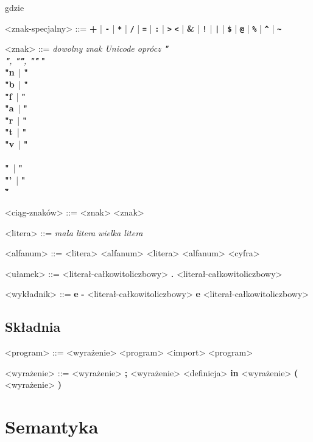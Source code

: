 \documentclass[12pt]{article}
\begin{document}
gdzie\\

\begin{grammar}

<znak-specjalny> ::=
    \textbf{+}
    | \textbf{\texttt{-}}
    | \textbf{\texttt{*}}
    | \textbf{\texttt{/}}
    | \textbf{\texttt{=}}
    | \textbf{\texttt{:}}
    | \textbf{\texttt{\textgreater}}
    \alt \textbf{\texttt{\textless}}
    | \textbf{\&}
    | \textbf{\texttt{!}}
    | \textbf{\texttt{|}}
    | \textbf{\texttt{\$}}
    | \textbf{\texttt{@}}
    | \textbf{\texttt{\%}}
    | \textbf{\texttt{\^}}
    | \textbf{\texttt{\~}}

    <znak> ::= 
        \textit{dowolny znak Unicode oprócz 
            \textbf{"\\"}, \textbf{"\""}, \textbf{"\'"}}
        \alt \textbf{"\\"n}\,
        | \textbf{"\\"b}\,
        | \textbf{"\\"f}\,
        | \textbf{"\\"a}\,
        | \textbf{"\\"r}\,
        | \textbf{"\\"t}\,
        | \textbf{"\\"v}\,
        | \textbf{"\\\\"}\,
        | \textbf{"\\"'}\,
        | \textbf{"\\\""}\,

    <ciąg-znaków> ::=
        <znak>
         <znak>
    
    <litera> ::=
        \textit{mała litera}
        \alt \textit{wielka litera}

    <alfanum> ::=
        <litera>
        \alt <alfanum> <litera>
        \alt <alfanum> <cyfra>

    <ułamek> ::=
        <literał-całkowitoliczbowy> \textbf{.} <literał-całkowitoliczbowy>
    
    <wykładnik> ::=
        \textbf{e} \textbf{-} <literał-całkowitoliczbowy>
        \alt \textbf{e} <literał-całkowitoliczbowy>

\end{grammar}

\subsection{Składnia}

\begin{grammar}

<program> ::= 
    <wyrażenie>
     <program>
    \alt <import> <program>

<wyrażenie> ::=
    <wyrażenie> \textbf{;} <wyrażenie>
    \alt <definicja> \textbf{in} <wyrażenie>
    \alt \textbf{(} <wyrażenie> \textbf{)}


\end{grammar}

\section{Semantyka}
\end{document}
